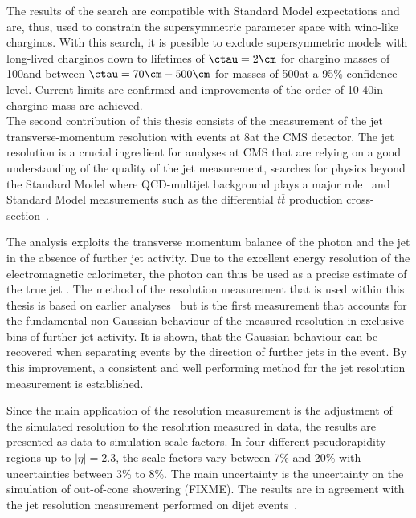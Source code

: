The results of the search are compatible with Standard Model expectations and are, thus, used to constrain the supersymmetric parameter space with wino-like charginos.
With this search, it is possible to exclude supersymmetric models with long-lived charginos down to lifetimes of $\ctau = 2\cm$ for chargino masses of 100\gev and between $\ctau = 70\cm- 500\cm$ for masses of 500\gev at a 95\% confidence level.
Current limits are confirmed and improvements of the order of 10-40\gev in chargino mass are achieved.\\

The second contribution of this thesis consists of the measurement of the jet transverse-momentum resolution with \GAMJET events at 8\tev at the CMS detector.
The jet \pt resolution is a crucial ingredient for analyses at CMS that are relying on a good understanding of the quality of the jet \pt measurement, \eg searches for physics beyond the Standard Model where QCD-multijet background plays a major role~\cite{bib:CMS:RA2_8TeV,bib:CMS:MT2_8TeV,bib:CMS:AlphaT_8TeV} and Standard Model measurements such as the differential $t\overline{t}$ production cross-section~\cite{bib:CMS:TopCrossSection_8TeV}.

The analysis exploits the transverse momentum balance of the photon and the jet in the absence of further jet activity.
Due to the excellent energy resolution of the electromagnetic calorimeter, the photon \pt can thus be used as a precise estimate of the true jet \pt.
The method of the resolution measurement that is used within this thesis is based on earlier analyses~\cite{bib:CMS:JERCPaper_2011,CMS:PAS:JETResolution_7TeV} but is the first measurement that accounts for the fundamental non-Gaussian behaviour of the measured resolution in exclusive bins of further jet activity.
It is shown, that the Gaussian behaviour can be recovered when separating events by the direction of further jets in the event.
By this improvement, a consistent and well performing method for the jet \pt resolution measurement is established.

Since the main application of the resolution measurement is the adjustment of the simulated resolution to the resolution measured in data, the results are presented as data-to-simulation scale factors.
In four different pseudorapidity regions up to $|\eta|=2.3$, the scale factors vary between 7\% and 20\% with uncertainties between 3\% to 8\%.
The main uncertainty is the uncertainty on the simulation of out-of-cone showering (FIXME).
The results are in agreement with the jet \pt resolution measurement performed on dijet events~\cite{bib:Kristin_Thesis}.\\

